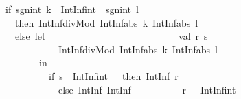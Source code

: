 \begin{isabellebody}
\begin{isamarkuptext}
\ \ \ \ \ \ \ \ \ \ \ \ \ \ \ \ \ \ {}if\ {}{}{}sgn{}int\ k{}\ {}\ IntInf{}int{}\ {}\ {}sgn{}int\ l{}{}\isanewline
\ \ \ \ \ \ \ \ \ \ \ \ \ \ \ \ \ \ \ \ then\ IntInf{}divMod\ {}IntInf{}abs\ k{}\ IntInf{}abs\ l{}\isanewline
\ \ \ \ \ \ \ \ \ \ \ \ \ \ \ \ \ \ \ \ else\ let\isanewline
\ \ \ \ \ \ \ \ \ \ \ \ \ \ \ \ \ \ \ \ \ \ \ \ \ \ \ val\ {}r{}\ s{}\ {}\isanewline
\ \ \ \ \ \ \ \ \ \ \ \ \ \ \ \ \ \ \ \ \ \ \ \ \ \ \ \ \ IntInf{}divMod\ {}IntInf{}abs\ k{}\ IntInf{}abs\ l{}{}\isanewline
\ \ \ \ \ \ \ \ \ \ \ \ \ \ \ \ \ \ \ \ \ \ \ \ \ in\isanewline
\ \ \ \ \ \ \ \ \ \ \ \ \ \ \ \ \ \ \ \ \ \ \ \ \ \ \ {}if\ {}{}s\ {}\ IntInf{}int{}\ {}\ {}{}\ then\ {}IntInf{}{}\ r{}\ {}{}\isanewline
\ \ \ \ \ \ \ \ \ \ \ \ \ \ \ \ \ \ \ \ \ \ \ \ \ \ \ \ \ else\ {}IntInf{}{}\ {}IntInf{}{}\isanewline
\ \ \ \ \ \ \ \ \ \ r{}\ {}{}\ {}\ IntInf{}int{}{}{}\isanewline

\end{isamarkuptext}
\end{isabellebody}
